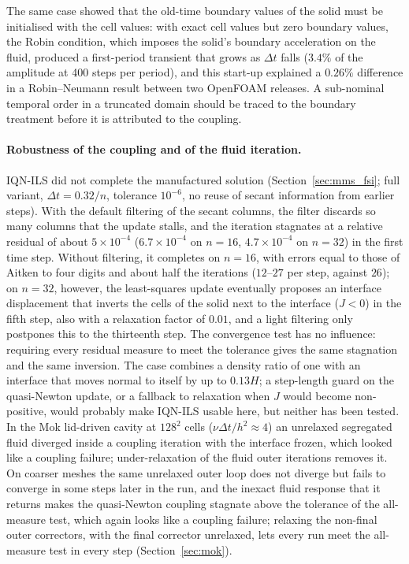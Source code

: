 The same case showed that the old-time boundary values of the solid must be initialised with the cell values: with exact cell values but zero boundary values, the Robin condition, which imposes the solid's boundary acceleration on the fluid, produced a first-period transient that grows as $\Delta t$ falls ($3.4\%$ of the amplitude at 400 steps per period), and this start-up explained a $0.26\%$ difference in a Robin--Neumann result between two OpenFOAM releases.
A sub-nominal temporal order in a truncated domain should be traced to the boundary treatment before it is attributed to the coupling.

\paragraph{Robustness of the coupling and of the fluid iteration.}
IQN-ILS did not complete the manufactured solution (Section~\ref{sec:mms_fsi}; full variant, $\Delta t = 0.32/n$, tolerance $10^{-6}$, no reuse of secant information from earlier steps).
With the default filtering of the secant columns, the filter discards so many columns that the update stalls, and the iteration stagnates at a relative residual of about $5\times10^{-4}$ ($6.7\times10^{-4}$ on $n = 16$, $4.7\times10^{-4}$ on $n = 32$) in the first time step.
Without filtering, it completes on $n = 16$, with errors equal to those of Aitken to four digits and about half the iterations ($12$--$27$ per step, against $26$); on $n = 32$, however, the least-squares update eventually proposes an interface displacement that inverts the cells of the solid next to the interface ($J < 0$) in the fifth step, also with a relaxation factor of $0.01$, and a light filtering only postpones this to the thirteenth step.
The convergence test has no influence: requiring every residual measure to meet the tolerance gives the same stagnation and the same inversion.
The case combines a density ratio of one with an interface that moves normal to itself by up to $0.13H$; a step-length guard on the quasi-Newton update, or a fallback to relaxation when $J$ would become non-positive, would probably make IQN-ILS usable here, but neither has been tested.
In the Mok lid-driven cavity at $128^2$ cells ($\nu\Delta t/h^2 \approx 4$) an unrelaxed segregated fluid diverged inside a coupling iteration with the interface frozen, which looked like a coupling failure; under-relaxation of the fluid outer iterations removes it.
On coarser meshes the same unrelaxed outer loop does not diverge but fails to converge in some steps later in the run, and the inexact fluid response that it returns makes the quasi-Newton coupling stagnate above the tolerance of the all-measure test, which again looks like a coupling failure; relaxing the non-final outer correctors, with the final corrector unrelaxed, lets every run meet the all-measure test in every step (Section~\ref{sec:mok}).
